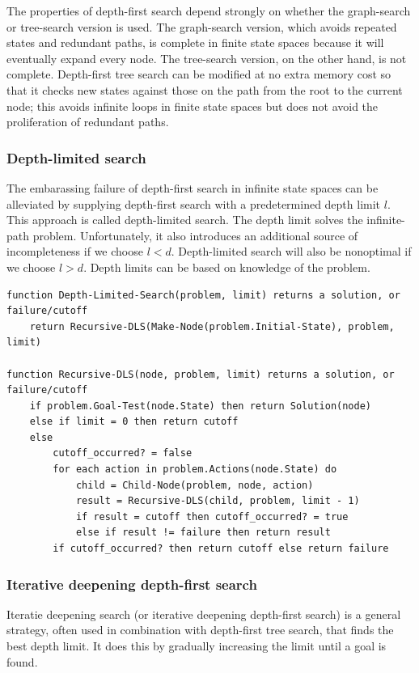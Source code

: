 \documentclass{article}
\begin{document}
The properties of depth-first search depend strongly on whether the graph-search or tree-search version is used. The graph-search version, which avoids repeated states and redundant paths, is complete in finite state spaces because it will eventually expand every node. The tree-search version, on the other hand, is not complete. Depth-first tree search can be modified at no extra memory cost so that it checks new states against those on the path from the root to the current node; this avoids infinite loops in finite state spaces but does not avoid the proliferation of redundant paths.

\subsubsection{Depth-limited search}

The embarassing failure of depth-first search in infinite state spaces can be alleviated by supplying depth-first search with a predetermined depth limit $ l $. This approach is called depth-limited search. The depth limit solves the infinite-path problem. Unfortunately, it also introduces an additional source of incompleteness if we choose $ l < d $. Depth-limited search will also be nonoptimal if we choose $ l > d $. Depth limits can be based on knowledge of the problem.

\begin{lstlisting}
function Depth-Limited-Search(problem, limit) returns a solution, or failure/cutoff
    return Recursive-DLS(Make-Node(problem.Initial-State), problem, limit)

function Recursive-DLS(node, problem, limit) returns a solution, or failure/cutoff
    if problem.Goal-Test(node.State) then return Solution(node)
    else if limit = 0 then return cutoff
    else
        cutoff_occurred? = false 
        for each action in problem.Actions(node.State) do 
            child = Child-Node(problem, node, action)
            result = Recursive-DLS(child, problem, limit - 1)
            if result = cutoff then cutoff_occurred? = true 
            else if result != failure then return result 
        if cutoff_occurred? then return cutoff else return failure
\end{lstlisting}

\subsubsection{Iterative deepening depth-first search}

Iteratie deepening search (or iterative deepening depth-first search) is a general strategy, often used in combination with depth-first tree search, that finds the best depth limit. It does this by gradually increasing the limit until a goal is found.
\end{document}
